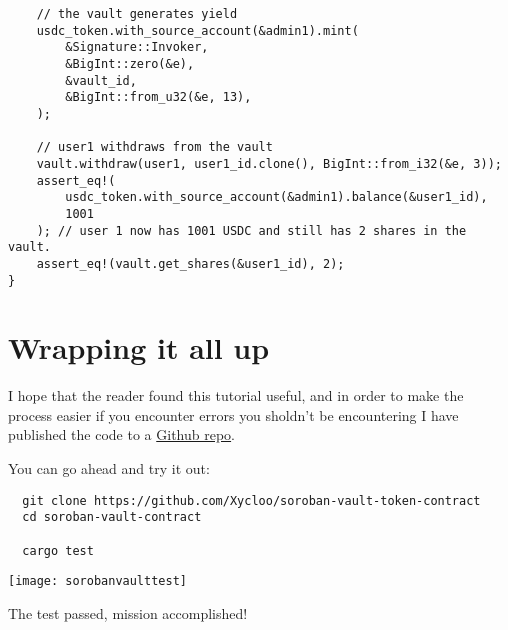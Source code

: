 \documentclass{article}
\begin{document}
\begin{lstlisting}
    // the vault generates yield
    usdc_token.with_source_account(&admin1).mint(
        &Signature::Invoker,
        &BigInt::zero(&e),
        &vault_id,
        &BigInt::from_u32(&e, 13),
    );

    // user1 withdraws from the vault
    vault.withdraw(user1, user1_id.clone(), BigInt::from_i32(&e, 3));
    assert_eq!(
        usdc_token.with_source_account(&admin1).balance(&user1_id),
        1001
    ); // user 1 now has 1001 USDC and still has 2 shares in the vault.
    assert_eq!(vault.get_shares(&user1_id), 2);
}

\end{lstlisting}

\section{Wrapping it all up}
I hope that the reader found this tutorial useful, and in order to make the process easier if you encounter errors you sholdn't be encountering I have published the code to a \href{https://github.com/Xycloo/soroban-vault-contract}{Github repo}.

You can go ahead and try it out:

\begin{lstlisting}
  git clone https://github.com/Xycloo/soroban-vault-token-contract
  cd soroban-vault-contract

  cargo test
\end{lstlisting}

\texttt{[image: sorobanvaulttest]}

The test passed, mission accomplished!
\end{document}

